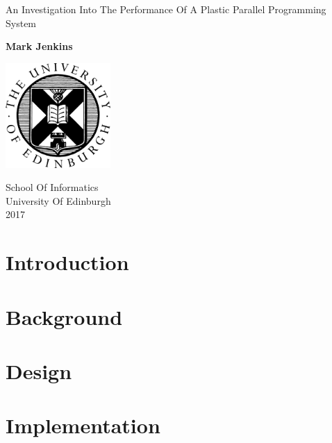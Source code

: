 \documentclass{report}
\begin{document}
\begin{titlepage}
    \begin{center}
        \vspace*{1cm}
        
        \Huge
        An Investigation Into The Performance Of A Plastic Parallel Programming System
        
        \vspace{1.5cm}
        
        \large
        \textbf{Mark Jenkins}
        
        \vspace{3.5cm}

        \includegraphics[width=0.3\textwidth]{university}

        \vspace{3.5cm}
        
        School Of Informatics\\
        University Of Edinburgh\\
        2017
        
    \end{center}
\end{titlepage}



\tableofcontents

\newpage

\chapter{Introduction}


\chapter{Background}


\chapter{Design}


\chapter{Implementation}

\end{document}
